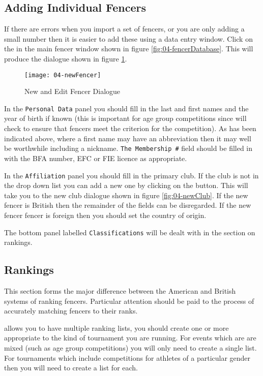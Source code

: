\documentclass[a4paper,11pt]{memoir}
\begin{document}
\subsection{Adding Individual Fencers}
If there are errors when you import a set of fencers, or you are only adding a small number then it is easier to add these using a data entry window. Click on the  in the main fencer window shown in figure \ref{fig:04-fencerDatabase}. This will produce the dialogue shown in figure \ref{fig:04-newFencer}.

\begin{figure}[!ht]
 \centering
 \texttt{[image: 04-newFencer]}
 \caption{New and Edit Fencer Dialogue} \label{fig:04-newFencer}
\end{figure}

In the \texttt{Personal Data} panel you should fill in the last and first names and the year of birth if known (this is important for age group competitions since \fencingtime{} will check to ensure that fencers meet the criterion for the competition). As has been indicated above, where a first name may have an abbreviation then it may well be worthwhile including a nickname. \texttt{The Membership \#} field should be filled in with the BFA number, EFC or FIE licence as appropriate.

In the \texttt{Affiliation} panel you should fill in the primary club. If the club is not in the drop down list you can add a new one by clicking on the  button. This will take you to the new club dialogue shown in figure \ref{fig:04-newClub}. If the new fencer is British then the remainder of the fields can be disregarded. If the new fencer fencer is foreign then you should set the country of origin.

The bottom panel labelled \texttt{Classifications} will be dealt with in the section on rankings.

\subsection{Rankings}\label{sec:rankings}

This section forms the major difference between the American and British systems of ranking fencers. Particular attention should be paid to the process of accurately matching fencers to their ranks. 

\fencingtime{} allows you to have multiple ranking lists, you should create one or more appropriate to the kind of tournament you are running. For events which are are mixed (such as age group competitions) you will only need to create a single list. For tournaments which include competitions for athletes of a particular gender then you will need to create a list for each.
\end{document}

